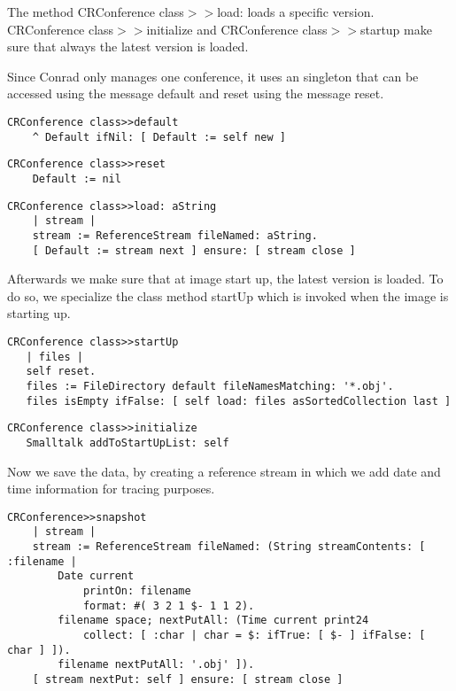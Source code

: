 \documentclass[a4paper,10pt,twoside]{book}
\newcommand{\ct}[1]{{\small\ttfamily\textup{#1}}}
\begin{document}
The method \ct{CRConference class$>$$>$load:} loads a specific version. \ct{CRConference class$>$$>$initialize} and \ct{CRConference class$>$$>$startup} make sure that always the latest version is loaded.

Since Conrad only manages one conference, it uses an singleton that can be accessed using the message \ct{default} and reset using the message \ct{reset}.

\begin{lstlisting}
CRConference class>>default
    ^ Default ifNil: [ Default := self new ]
\end{lstlisting}

\begin{lstlisting}
CRConference class>>reset
    Default := nil
\end{lstlisting}

\begin{lstlisting}
CRConference class>>load: aString
    | stream |
    stream := ReferenceStream fileNamed: aString.
    [ Default := stream next ] ensure: [ stream close ]
\end{lstlisting}

Afterwards we make sure that at image start up, the latest version is loaded. To do so, we specialize the class method \ct{startUp} which is invoked when the image is starting up.

\begin{lstlisting}
CRConference class>>startUp
   | files |
   self reset.
   files := FileDirectory default fileNamesMatching: '*.obj'.
   files isEmpty ifFalse: [ self load: files asSortedCollection last ]
\end{lstlisting}

\begin{lstlisting}
CRConference class>>initialize
   Smalltalk addToStartUpList: self
\end{lstlisting}

Now we save the data, by creating a reference stream in which we add date and time information for tracing purposes.

\begin{lstlisting}
CRConference>>snapshot
    | stream |
    stream := ReferenceStream fileNamed: (String streamContents: [ :filename |
        Date current
            printOn: filename
            format: #( 3 2 1 $- 1 1 2).
        filename space; nextPutAll: (Time current print24
            collect: [ :char | char = $: ifTrue: [ $- ] ifFalse: [ char ] ]).
        filename nextPutAll: '.obj' ]).
    [ stream nextPut: self ] ensure: [ stream close ]
\end{lstlisting}
\end{document}
